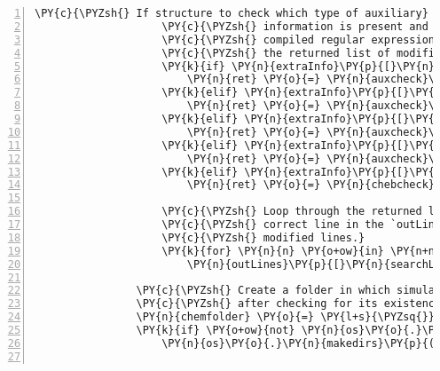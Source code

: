 \begin{Verbatim}[commandchars=\\\{\},fontsize=\small,numbers=left,firstnumber=1,stepnumber=2,firstline=2]
                    \PY{c}{\PYZsh{} If structure to check which type of auxiliary}
                    \PY{c}{\PYZsh{} information is present and send the proper}
                    \PY{c}{\PYZsh{} compiled regular expression to auxcheck. `ret` is}
                    \PY{c}{\PYZsh{} the returned list of modified lines.}
                    \PY{k}{if} \PY{n}{extraInfo}\PY{p}{[}\PY{n}{rxnNum}\PY{p}{]} \PY{o}{==} \PY{l+m+mi}{1}\PY{p}{:}
                        \PY{n}{ret} \PY{o}{=} \PY{n}{auxcheck}\PY{p}{(}\PY{n}{sendLines}\PY{p}{,} \PY{n}{lowmatch}\PY{p}{,} \PY{n}{multfactor}\PY{p}{)}
                    \PY{k}{elif} \PY{n}{extraInfo}\PY{p}{[}\PY{n}{rxnNum}\PY{p}{]} \PY{o}{==} \PY{l+m+mi}{2}\PY{p}{:}
                        \PY{n}{ret} \PY{o}{=} \PY{n}{auxcheck}\PY{p}{(}\PY{n}{sendLines}\PY{p}{,} \PY{n}{highmatch}\PY{p}{,} \PY{n}{multfactor}\PY{p}{)}
                    \PY{k}{elif} \PY{n}{extraInfo}\PY{p}{[}\PY{n}{rxnNum}\PY{p}{]} \PY{o}{==} \PY{l+m+mi}{3}\PY{p}{:}
                        \PY{n}{ret} \PY{o}{=} \PY{n}{auxcheck}\PY{p}{(}\PY{n}{sendLines}\PY{p}{,} \PY{n}{revmatch}\PY{p}{,} \PY{n}{multfactor}\PY{p}{)}
                    \PY{k}{elif} \PY{n}{extraInfo}\PY{p}{[}\PY{n}{rxnNum}\PY{p}{]} \PY{o}{==} \PY{l+m+mi}{4}\PY{p}{:}
                        \PY{n}{ret} \PY{o}{=} \PY{n}{auxcheck}\PY{p}{(}\PY{n}{sendLines}\PY{p}{,} \PY{n}{plogmatch}\PY{p}{,} \PY{n}{multfactor}\PY{p}{)}
                    \PY{k}{elif} \PY{n}{extraInfo}\PY{p}{[}\PY{n}{rxnNum}\PY{p}{]} \PY{o}{==} \PY{l+m+mi}{5}\PY{p}{:}
                        \PY{n}{ret} \PY{o}{=} \PY{n}{chebcheck}\PY{p}{(}\PY{n}{sendLines}\PY{p}{,} \PY{n}{multfactor}\PY{p}{)}

                    \PY{c}{\PYZsh{} Loop through the returned lines and set the}
                    \PY{c}{\PYZsh{} correct line in the `outLines` list to the}
                    \PY{c}{\PYZsh{} modified lines.}
                    \PY{k}{for} \PY{n}{n} \PY{o+ow}{in} \PY{n+nb}{range}\PY{p}{(}\PY{n+nb}{len}\PY{p}{(}\PY{n}{searchLines}\PY{p}{[}\PY{n}{rxnNum}\PY{p}{]}\PY{p}{)}\PY{p}{)}\PY{p}{:}
                        \PY{n}{outLines}\PY{p}{[}\PY{n}{searchLines}\PY{p}{[}\PY{n}{rxnNum}\PY{p}{]}\PY{p}{[}\PY{n}{n}\PY{p}{]}\PY{p}{]} \PY{o}{=} \PY{n}{ret}\PY{p}{[}\PY{n}{n}\PY{p}{]}

                \PY{c}{\PYZsh{} Create a folder in which simulations will be run,}
                \PY{c}{\PYZsh{} after checking for its existence.}
                \PY{n}{chemfolder} \PY{o}{=} \PY{l+s}{\PYZsq{}}\PY{l+s}{Reaction}\PY{l+s}{\PYZsq{}} \PY{o}{+} \PY{n+nb}{str}\PY{p}{(}\PY{n}{rxnNum} \PY{o}{+} \PY{l+m+mi}{1}\PY{p}{)}
                \PY{k}{if} \PY{o+ow}{not} \PY{n}{os}\PY{o}{.}\PY{n}{path}\PY{o}{.}\PY{n}{exists}\PY{p}{(}\PY{n}{chemfolder}\PY{p}{)}\PY{p}{:}
                    \PY{n}{os}\PY{o}{.}\PY{n}{makedirs}\PY{p}{(}\PY{n}{chemfolder}\PY{p}{)}


\end{Verbatim}
